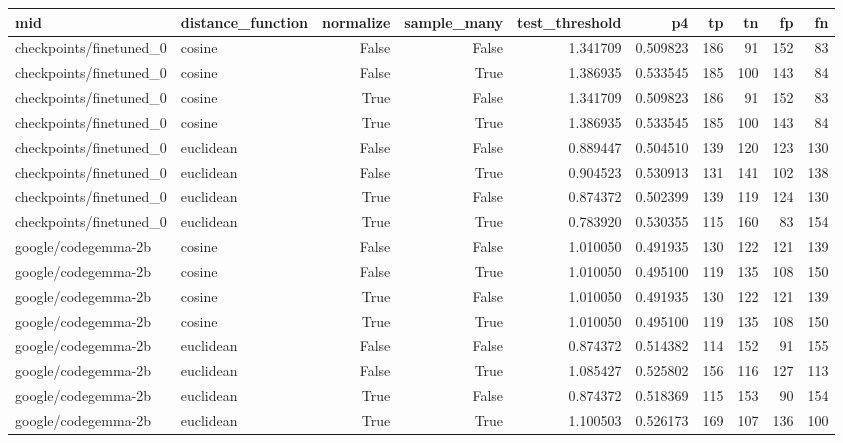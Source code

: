 \begin{tabular}{llrrrrrrrr}
\toprule
mid & distance_function & normalize & sample_many & test_threshold & p4 & tp & tn & fp & fn \\
\midrule
checkpoints/finetuned_0 & cosine & False & False & 1.341709 & 0.509823 & 186 & 91 & 152 & 83 \\
checkpoints/finetuned_0 & cosine & False & True & 1.386935 & 0.533545 & 185 & 100 & 143 & 84 \\
checkpoints/finetuned_0 & cosine & True & False & 1.341709 & 0.509823 & 186 & 91 & 152 & 83 \\
checkpoints/finetuned_0 & cosine & True & True & 1.386935 & 0.533545 & 185 & 100 & 143 & 84 \\
checkpoints/finetuned_0 & euclidean & False & False & 0.889447 & 0.504510 & 139 & 120 & 123 & 130 \\
checkpoints/finetuned_0 & euclidean & False & True & 0.904523 & 0.530913 & 131 & 141 & 102 & 138 \\
checkpoints/finetuned_0 & euclidean & True & False & 0.874372 & 0.502399 & 139 & 119 & 124 & 130 \\
checkpoints/finetuned_0 & euclidean & True & True & 0.783920 & 0.530355 & 115 & 160 & 83 & 154 \\
google/codegemma-2b & cosine & False & False & 1.010050 & 0.491935 & 130 & 122 & 121 & 139 \\
google/codegemma-2b & cosine & False & True & 1.010050 & 0.495100 & 119 & 135 & 108 & 150 \\
google/codegemma-2b & cosine & True & False & 1.010050 & 0.491935 & 130 & 122 & 121 & 139 \\
google/codegemma-2b & cosine & True & True & 1.010050 & 0.495100 & 119 & 135 & 108 & 150 \\
google/codegemma-2b & euclidean & False & False & 0.874372 & 0.514382 & 114 & 152 & 91 & 155 \\
google/codegemma-2b & euclidean & False & True & 1.085427 & 0.525802 & 156 & 116 & 127 & 113 \\
google/codegemma-2b & euclidean & True & False & 0.874372 & 0.518369 & 115 & 153 & 90 & 154 \\
google/codegemma-2b & euclidean & True & True & 1.100503 & 0.526173 & 169 & 107 & 136 & 100 \\
\bottomrule
\end{tabular}
